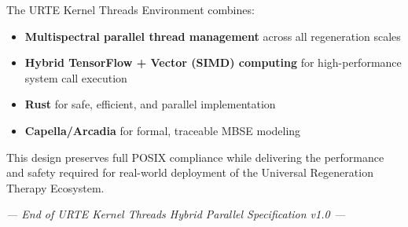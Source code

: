 \documentclass[11pt,a4paper]{report}
\begin{document}
The URTE Kernel Threads Environment combines:
\begin{itemize}
    \item \textbf{Multispectral parallel thread management} across all regeneration scales
    \item \textbf{Hybrid TensorFlow + Vector (SIMD) computing} for high-performance system call execution
    \item \textbf{Rust} for safe, efficient, and parallel implementation
    \item \textbf{Capella/Arcadia} for formal, traceable MBSE modeling
\end{itemize}

This design preserves full POSIX compliance while delivering the performance and safety required for real-world deployment of the Universal Regeneration Therapy Ecosystem.

\vspace{0.8cm}
\begin{center}
\textit{--- End of URTE Kernel Threads Hybrid Parallel Specification v1.0 ---}
\end{center}
\end{document}
